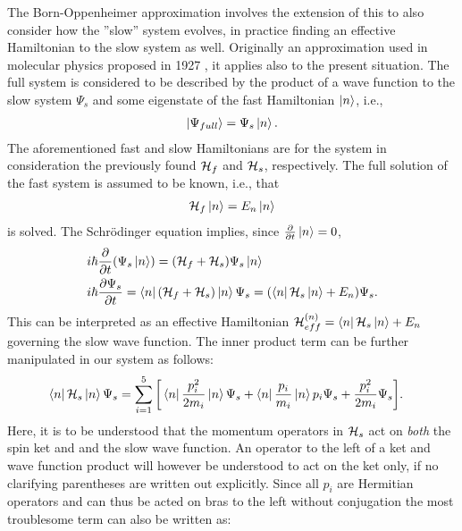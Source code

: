 \documentclass[a4paper]{article}
\begin{document}
The Born-Oppenheimer approximation involves the extension of this to also consider how the
''slow'' system evolves, in practice finding an effective Hamiltonian to the slow system as
well. Originally an approximation used in molecular physics proposed in
1927 \cite{bo}, it applies also to the present situation. The full system is considered to be described by the product of a wave function to the slow
system \(\Psi_s\) and  some eigenstate of the fast Hamiltonian \(\ket{n}\), i.e.,
\begin{align*}
        \ket{\Psi_{full}} = \Psi_s\ket{n}
.\end{align*}
The aforementioned fast and slow Hamiltonians are for the system in consideration the
previously found \(\mathbb{\cal H}_f\) and \(\mathbb{\cal H}_s\), respectively. The full
solution of the fast system is assumed to be known, i.e., that
\begin{align*}
        \mathbb{\cal H}_f \ket{n} = E_n\ket{n}
\end{align*}
is solved.
The Schrödinger equation implies, since \(\frac{\partial }{\partial t} \ket{n} = 0\),
\begin{align*}
        &i\hbar{}\frac{\partial }{\partial t} (\Psi_s\ket{n}) = (\mathbb{\cal H}_f +
        \mathbb{\cal H}_s) \Psi_s\ket{n}\\
        &i\hbar{}\frac{\partial \Psi_s}{\partial t} = \bra{n}(\mathbb{\cal H}_f +
        \mathbb{\cal H}_s)\ket{n}\Psi_s = (\bra{n}\mathbb{\cal H}_s\ket{n} +
        E_n)\Psi_s
.\end{align*}
This can be interpreted as an effective Hamiltonian \(\mathbb{\cal H}^{(n)}_{eff} =
\bra{n}\mathbb{\cal H}_s\ket{n} + E_n\) governing the slow wave function.
The inner product term can be further manipulated in our system as follows:
\begin{align*}
        \bra{n} \mathbb{\cal H}_s \ket{n} \Psi_s &= \sum_{i=1}^{5} \bigg[\bra{n}
        \frac{p_i^2}{2m_i}\ket{n} \Psi_s + \bra{n} \frac{p_i}{m_i} \ket{n}
        p_i\Psi_s + \frac{p_i^2}{2m_i}\Psi_s\bigg]
.\end{align*}
Here, it is to be understood that the momentum operators in \(\mathbb{\cal H}_s\) act on
\textit{both} the spin ket and
and the slow wave function. An operator to the left of a ket and wave function product will
however be understood to act on the ket only, if no clarifying parentheses are written out
explicitly.
Since all \(p_i\) are Hermitian operators and can thus be acted on bras to the left
without conjugation the most troublesome term can also be
written as: %
\end{document}
